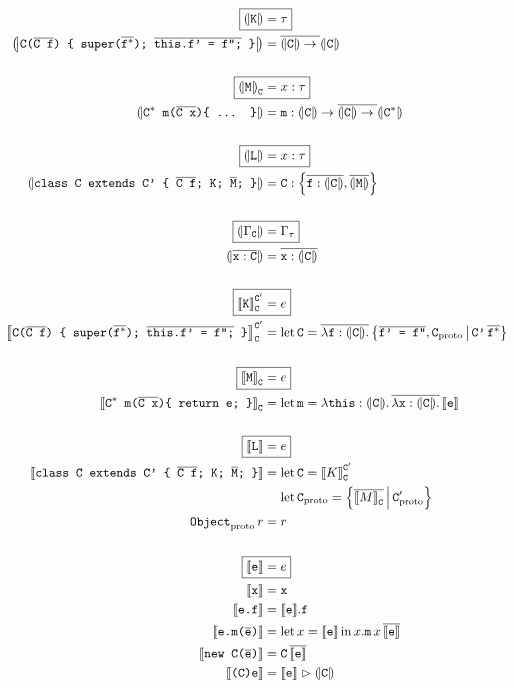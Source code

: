 \begin{align*}    
    \Aboxed{\denoty{\fj K} &= \tau} \\
    \denoty{\fjconsdef} &= \overline{\denoty{\fj C} \to {}} \denoty{\fj{C}} \\
    \\
    \Aboxed{\denoty{\fj M}_{\fj C} &= x : \tau} \\
    \denoty{\fjmethdefx} &= \fj m : \denoty{\fj C} \to \overline{\denoty{\fj C} \to {}} \denoty{\fj{C}^*} \\
    \\
    \Aboxed{\denoty{\fj L} &= x : \tau} \\
    \denoty{\fjclassdef} &= \fj C : \flrec{\overline{\fj{f}: \denoty{\fj{C}}}, \overline{\denoty{\fj M}}} \\
    \\
    \Aboxed{\denoty{\Gamma_{\fj C}} &= \Gamma_\tau} \\
    \denoty{\overline{\fj x : \fj C}} &= \overline{\fj x : \denoty{\fj C}} \\
    \\
    \Aboxed{\denot{\fj K}_{\fj{C}}^{\fj{C}'} &= e} \\
    \denot{\fjconsdef}_{\fj{C}}^{\fj{C}'} &= \flletx{\fj C}{\overline{\fllam{\fj f : \denoty{\fj C}}}\, \flext{\fj{\fjoverline{f' = f''}}, \fj C_\mathrm{proto}}{\fj{C'}\,\overline{\fj{f}^*}}}
    \\ \\
    \Aboxed{\denot{\fj M}_{\fj C} &= e} \\
    \denot{\fjmethdef}_{\fj C} &= \flletx{\fj m}{\fllam{\fj{this} : \denoty{\fj C}} \overline{\fllam{\fj x: \denoty{\fj C}}}\, \denot{\fj e}}
    \\ \\
    \Aboxed{\denot{\fj L} &= e} \\
    \denot{\fjclassdef} &= \flletx{\fj C}{\denot{K}_{\fj C}^{\fj C'}} \\
    &\phantom{{}={}} \flletx{\fj{C}_\mathrm{proto}}{\flext{\overline{\denot{M}_{\fj C}}}{\fj C'_\mathrm{proto}}} \\
    \fj{Object}_\mathrm{proto}\,r &= r
    \\ \\
    \Aboxed{\denot{\fj e} &= e} \\
    \denot{\fj x} &= \fj x \\
    \denot{\fj {e.f}} &= \flproj{\denot{\fj e}}{\fj f} \\
    \denot{\fj {e.m(\fjoverline e)}} &= \fllet{x}{\denot{\fj e}} \flproj{x}{\fj m}\,x\,\overline{\denot{\fj e}} \\
    \denot{\fj {new C(\fjoverline e)}} &= \fj{C}\,\overline{\denot{\fj e}} \\
    \denot{\fj {(C)e}} &= \flcast{\denot {\fj e}}{\denoty {\fj C}} 
\end{align*}